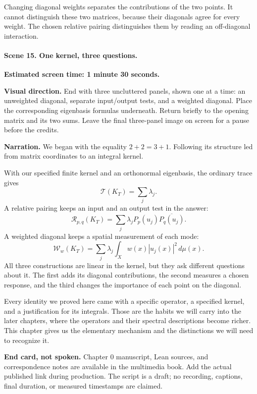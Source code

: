 Changing diagonal weights separates the contributions of the two points. It cannot distinguish these two matrices, because their diagonals agree for every weight. The chosen relative pairing distinguishes them by reading an off-diagonal interaction.

\paragraph{Scene 15. One kernel, three questions.}
\textbf{Estimated screen time: 1 minute 30 seconds.}

\textbf{Visual direction.} End with three uncluttered panels, shown one at a time: an unweighted diagonal, separate input/output tests, and a weighted diagonal. Place the corresponding eigenbasis formulas underneath. Return briefly to the opening matrix and its two sums. Leave the final three-panel image on screen for a pause before the credits.

\textbf{Narration.} We began with the equality $2+2=3+1$. Following its structure led from matrix coordinates to an integral kernel.

With our specified finite kernel and an orthonormal eigenbasis, the ordinary trace gives
\[
\mathcal T(K_T)=\sum_j\lambda_j.
\]
A relative pairing keeps an input and an output test in the answer:
\[
\mathcal R_{p,q}(K_T)
=\sum_j\lambda_jP_p(u_j)\overline{P_q(u_j)}.
\]
A weighted diagonal keeps a spatial measurement of each mode:
\[
\mathcal W_w(K_T)
=\sum_j\lambda_j\int_Xw(x)|u_j(x)|^2\,d\mu(x).
\]
All three constructions are linear in the kernel, but they ask different questions about it. The first adds its diagonal contributions, the second measures a chosen response, and the third changes the importance of each point on the diagonal.

Every identity we proved here came with a specific operator, a specified kernel, and a justification for its integrals. Those are the habits we will carry into the later chapters, where the operators and their spectral descriptions become richer. This chapter gives us the elementary mechanism and the distinctions we will need to recognize it.

\textbf{End card, not spoken.} Chapter 0 manuscript, Lean sources, and correspondence notes are available in the multimedia book. Add the actual published link during production. The script is a draft; no recording, captions, final duration, or measured timestamps are claimed.
